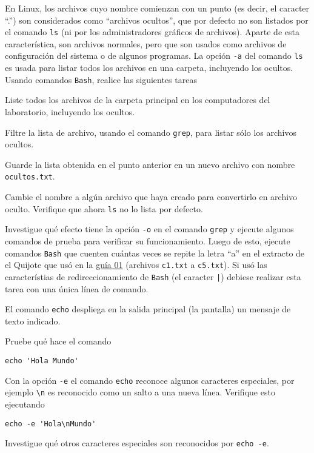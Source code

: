 \documentclass[11pt]{exam}
\begin{document}
\begin{questions}

\item En Linux, los archivos cuyo nombre comienzan con un punto (es decir, el caracter ``.'') son considerados como ``archivos ocultos'', que por defecto no son listados por el comando \texttt{ls} (ni por los administradores gráficos de archivos). Aparte de esta característica, son archivos normales, pero que son usados como archivos de configuración del sistema o de algunos programas. La opción \texttt{-a} del comando \texttt{ls} es usada para listar todos los archivos en una carpeta, incluyendo los ocultos. Usando comandos \texttt{Bash}, realice las siguientes tareas
\begin{parts}
\item Liste todos los archivos de la carpeta principal en los computadores del laboratorio, incluyendo los ocultos.
\item Filtre la lista de archivo, usando el comando \texttt{grep}, para listar sólo los archivos ocultos.
\item Guarde la lista obtenida en el punto anterior en un nuevo archivo con nombre \texttt{ocultos.txt}.
\item Cambie el nombre a algún archivo que haya creado para convertirlo en archivo oculto. Verifique que ahora \texttt{ls} no lo lista por defecto.
\end{parts}

\item Investigue qué efecto tiene la opción \texttt{-o} en el comando \texttt{grep} y ejecute algunos comandos de prueba para verificar su funcionamiento. Luego de esto, ejecute comandos \texttt{Bash} que cuenten cuántas veces se repite la letra ``a'' en el extracto de el Quijote que usó en la \href{https://github.com/gfrubi/CC/tree/master/guias/01}{guía 01} (archivos \texttt{c1.txt} a \texttt{c5.txt}). Si usó las característias de redireccionamiento de \texttt{Bash} (el caracter \texttt{|}) debiese realizar esta tarea con una única línea de comando.

\item El comando \texttt{echo} despliega en la salida principal (la pantalla) un mensaje de texto indicado.
\begin{parts}
\item Pruebe qué hace el comando 
\begin{verbatim}
echo 'Hola Mundo'
\end{verbatim}
\item Con la opción \texttt{-e} el comando \texttt{echo} reconoce algunos caracteres especiales, por ejemplo \verb|\n| es reconocido como un salto a una nueva línea. Verifique esto ejecutando
\begin{verbatim}
echo -e 'Hola\nMundo'
\end{verbatim}
\item Investigue qué otros caracteres especiales son reconocidos por \texttt{echo -e}.
\end{parts}


\end{questions}
\end{document}
